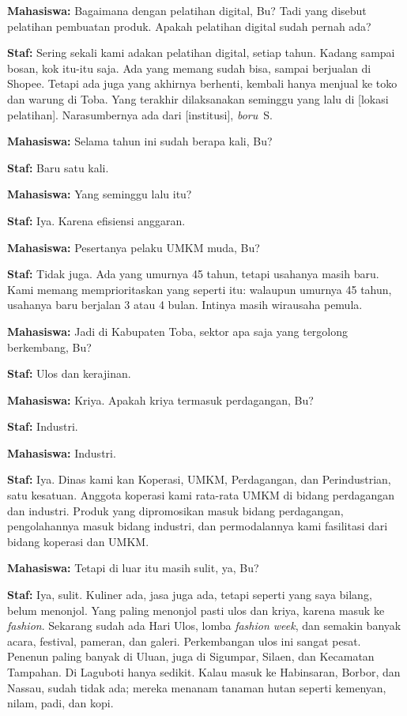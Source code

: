 {\noindent \textbf{Mahasiswa:} Bagaimana dengan pelatihan digital, Bu? Tadi yang disebut pelatihan pembuatan produk. Apakah pelatihan digital sudah pernah ada?

\noindent \textbf{Staf:} Sering sekali kami adakan pelatihan digital, setiap tahun. Kadang sampai bosan, kok itu-itu saja. Ada yang memang sudah bisa, sampai berjualan di Shopee. Tetapi ada juga yang akhirnya berhenti, kembali hanya menjual ke toko dan warung di Toba. Yang terakhir dilaksanakan seminggu yang lalu di [lokasi pelatihan]. Narasumbernya ada dari [institusi], \textit{boru}~S.

\noindent \textbf{Mahasiswa:} Selama tahun ini sudah berapa kali, Bu?

\noindent \textbf{Staf:} Baru satu kali.

\noindent \textbf{Mahasiswa:} Yang seminggu lalu itu?

\noindent \textbf{Staf:} Iya. Karena efisiensi anggaran.

\noindent \textbf{Mahasiswa:} Pesertanya pelaku UMKM muda, Bu?

\noindent \textbf{Staf:} Tidak juga. Ada yang umurnya 45 tahun, tetapi usahanya masih baru. Kami memang memprioritaskan yang seperti itu: walaupun umurnya 45 tahun, usahanya baru berjalan 3 atau 4 bulan. Intinya masih wirausaha pemula.

\noindent \textbf{Mahasiswa:} Jadi di Kabupaten Toba, sektor apa saja yang tergolong berkembang, Bu?

\noindent \textbf{Staf:} Ulos dan kerajinan.

\noindent \textbf{Mahasiswa:} Kriya. Apakah kriya termasuk perdagangan, Bu?

\noindent \textbf{Staf:} Industri.

\noindent \textbf{Mahasiswa:} Industri.

\noindent \textbf{Staf:} Iya. Dinas kami kan Koperasi, UMKM, Perdagangan, dan Perindustrian, satu kesatuan. Anggota koperasi kami rata-rata UMKM di bidang perdagangan dan industri. Produk yang dipromosikan masuk bidang perdagangan, pengolahannya masuk bidang industri, dan permodalannya kami fasilitasi dari bidang koperasi dan UMKM.

\noindent \textbf{Mahasiswa:} Tetapi di luar itu masih sulit, ya, Bu?

\noindent \textbf{Staf:} Iya, sulit. Kuliner ada, jasa juga ada, tetapi seperti yang saya bilang, belum menonjol. Yang paling menonjol pasti ulos dan kriya, karena masuk ke \textit{fashion}. Sekarang sudah ada Hari Ulos, lomba \textit{fashion week}, dan semakin banyak acara, festival, pameran, dan galeri. Perkembangan ulos ini sangat pesat. Penenun paling banyak di Uluan, juga di Sigumpar, Silaen, dan Kecamatan Tampahan. Di Laguboti hanya sedikit. Kalau masuk ke Habinsaran, Borbor, dan Nassau, sudah tidak ada; mereka menanam tanaman hutan seperti kemenyan, nilam, padi, dan kopi.

}
